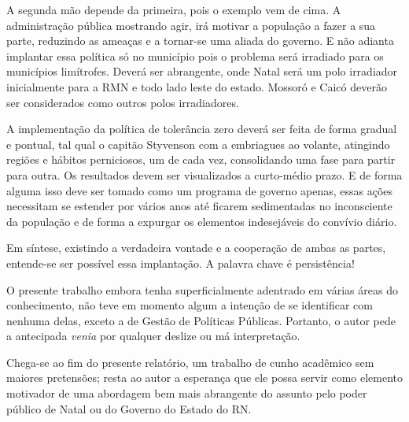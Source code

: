 \documentclass[
	12pt,				%
	openright,			%
	twoside,			%
	a4paper,			%
	chapter=TITLE,		%
	section=TITLE,		%
	subsection=TITLE,	%
	subsubsection=TITLE,%
	spanish,            %
	english,			%
	brazil				%
	]{abntex2}
\begin{document}
\par
A segunda mão depende da primeira, pois o exemplo vem de cima. A administração pública mostrando agir, irá motivar a população a fazer a sua parte, reduzindo as ameaças e a tornar-se uma aliada do governo. E não adianta implantar essa política só no município pois o problema será irradiado para os municípios limítrofes. Deverá ser abrangente, onde Natal será um polo irradiador inicialmente para a RMN e todo lado leste do estado. Mossoró e Caicó deverão ser considerados como outros polos irradiadores.
\par
A implementação da política de tolerância zero deverá ser feita de forma gradual e pontual, tal qual o capitão Styvenson com a embriagues ao volante, atingindo regiões e hábitos perniciosos, um de cada vez, consolidando uma fase para partir para outra. Os resultados devem ser visualizados a curto-médio prazo. E de forma alguma isso deve ser tomado como um programa de governo apenas, essas ações necessitam se estender por vários anos até ficarem sedimentadas no inconsciente da população e de forma a expurgar os elementos indesejáveis do convívio diário.
\par
Em síntese, existindo a verdadeira vontade e a cooperação de ambas as partes, entende-se ser possível essa implantação. A palavra chave é persistência!
\par
O presente trabalho embora tenha superficialmente adentrado em várias áreas do conhecimento, não teve em momento algum a intenção de se identificar com nenhuma delas, exceto a de Gestão de Políticas Públicas. Portanto, o autor pede a antecipada \textit{venia} por qualquer deslize ou má interpretação. 
\par
Chega-se ao fim do presente relatório, um trabalho de cunho acadêmico sem maiores pretensões; resta ao autor a esperança que ele possa servir como elemento motivador de uma abordagem bem mais abrangente do assunto pelo poder público de Natal ou do Governo do Estado do RN.

\postextual


\end{document}
